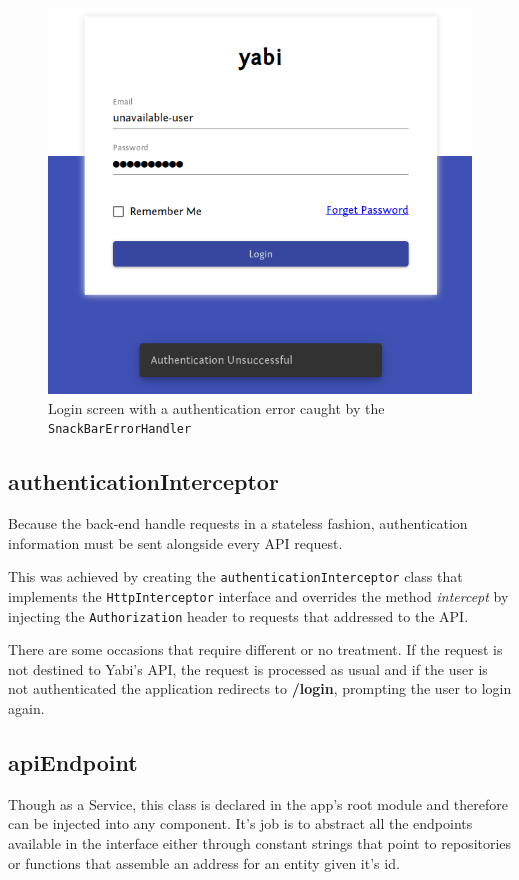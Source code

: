 \begin{figure}
  \centering
  \includegraphics[width=.7\textwidth]{images/screenshots/login-error}
  \caption{Login screen with a authentication error caught by the \texttt{SnackBarErrorHandler}}\label{fig:loginerror}
\end{figure}

\subsection{authenticationInterceptor}
Because the back-end handle requests in a stateless fashion, authentication information must be sent alongside every \gls{API} request.

This was achieved by creating the \texttt{authenticationInterceptor} class that implements the \texttt{HttpInterceptor} interface and overrides the method \textit{intercept} by injecting the \texttt{Authorization} header to requests that addressed to the \gls{API}.

There are some occasions that require different or no treatment. If the request is not destined to \gls{Yabi}'s \gls{API}, the request is processed as usual and if the user is not authenticated the application redirects to \textbf{/login}, prompting the user to login again.

\subsection{apiEndpoint}
Though as a Service, this class is declared in the app's root module and therefore can be injected into any component. It's job is to abstract all the endpoints available in the interface either through constant strings that point to repositories or functions that assemble an address for an entity given it's id.

